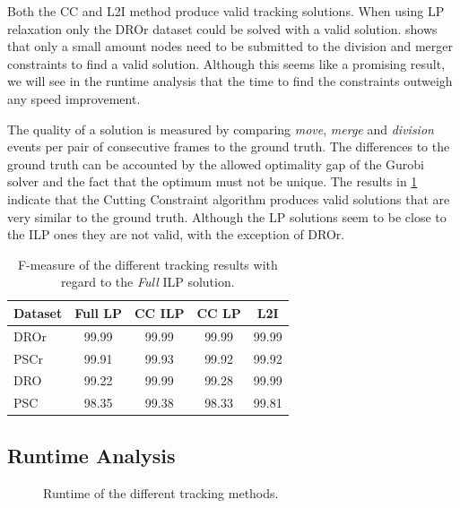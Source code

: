 \documentclass[10pt,twocolumn,letterpaper]{article}
\begin{document}
Both the CC and L2I method produce valid tracking solutions. When using LP relaxation only the DROr dataset could be solved with a valid solution.  shows that only a small amount nodes need to be submitted to the division and merger constraints to find a valid solution. Although this seems like a promising result, we will see in the runtime analysis that the time to find the constraints outweigh any speed improvement.

The quality of a solution is measured by comparing \textit{move}, \textit{merge} and \textit{division} events per pair of consecutive frames to the ground truth. The differences to the ground truth can be accounted by the allowed optimality gap of the Gurobi solver and the fact that the optimum must not be unique. The results in \cref{tab:fmeasure} indicate that the Cutting Constraint algorithm produces valid solutions that are very similar to the ground truth. Although the LP solutions seem to be close to the ILP ones they are not valid, with the exception of DROr.

\begin{table}
  \begin{center}
  \begin{tabular}{|l||c|c|c|c|}
    \hline
    Dataset & Full LP & CC ILP & CC LP & L2I\\
    \hline\hline
    DROr & 99.99 & 99.99 & 99.99 & 99.99\\
    PSCr & 99.91 & 99.93 & 99.92 & 99.92\\
    DRO & 99.22 & 99.99 & 99.28 & 99.99 \\
    PSC & 98.35 & 99.38 & 98.33 & 99.81\\
    \hline
  \end{tabular}
  \end{center}
  \caption{F-measure of the different tracking results with regard to the \textit{Full} ILP solution.}
  \label{tab:fmeasure}
\end{table}


\subsection{Runtime Analysis}

\begin{figure}[t]
  \begin{center}
  \fbox{\rule{0pt}{2in} \rule{0.9\linewidth}{0pt}}
  \end{center}
   \caption{Runtime of the different tracking methods.}
  \label{fig:runtime}
\end{figure}
\end{document}
